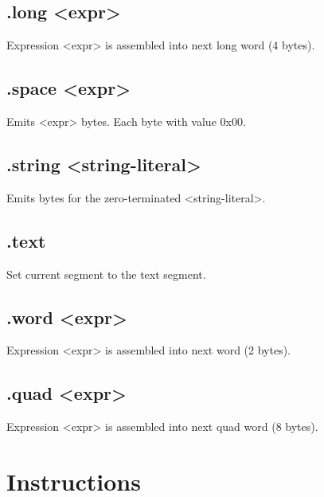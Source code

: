 \documentclass[
   a4paper,
   twoside,
   bringhurst,
   palatino,
   english,
   titlepage,
   fleqn
]{refman}
\begin{document}
    \section{.long <expr>}

    Expression <expr> is assembled into next long word (4 bytes).

    \section{.space <expr>}

    Emits <expr> bytes. Each byte with value 0x00.

    \section{.string <string-literal>}

    Emits bytes for the zero-terminated <string-literal>.

    \section{.text}

    Set current segment to the text segment.

    \section{.word <expr>}

    Expression <expr> is assembled into next word (2 bytes).

    \section{.quad <expr> }

    Expression <expr> is assembled into next quad word (8 bytes).


    \chapter{Instructions}

   \printindex
   \nocite{*}
   
\end{document}
